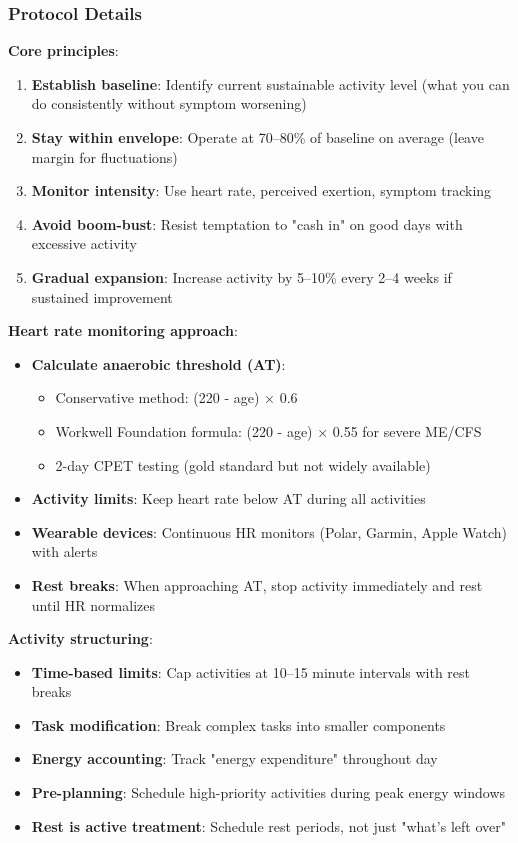 \subsubsection{Protocol Details}

\textbf{Core principles}:
\begin{enumerate}
    \item \textbf{Establish baseline}: Identify current sustainable activity level (what you can do consistently without symptom worsening)
    \item \textbf{Stay within envelope}: Operate at 70--80\% of baseline on average (leave margin for fluctuations)
    \item \textbf{Monitor intensity}: Use heart rate, perceived exertion, symptom tracking
    \item \textbf{Avoid boom-bust}: Resist temptation to "cash in" on good days with excessive activity
    \item \textbf{Gradual expansion}: Increase activity by 5--10\% every 2--4 weeks if sustained improvement
\end{enumerate}

\textbf{Heart rate monitoring approach}:
\begin{itemize}
    \item \textbf{Calculate anaerobic threshold (AT)}:
        \begin{itemize}
            \item Conservative method: (220 - age) × 0.6
            \item Workwell Foundation formula: (220 - age) × 0.55 for severe ME/CFS
            \item 2-day CPET testing (gold standard but not widely available)
        \end{itemize}
    \item \textbf{Activity limits}: Keep heart rate below AT during all activities
    \item \textbf{Wearable devices}: Continuous HR monitors (Polar, Garmin, Apple Watch) with alerts
    \item \textbf{Rest breaks}: When approaching AT, stop activity immediately and rest until HR normalizes
\end{itemize}

\textbf{Activity structuring}:
\begin{itemize}
    \item \textbf{Time-based limits}: Cap activities at 10--15 minute intervals with rest breaks
    \item \textbf{Task modification}: Break complex tasks into smaller components
    \item \textbf{Energy accounting}: Track "energy expenditure" throughout day
    \item \textbf{Pre-planning}: Schedule high-priority activities during peak energy windows
    \item \textbf{Rest is active treatment}: Schedule rest periods, not just "what's left over"
\end{itemize}

